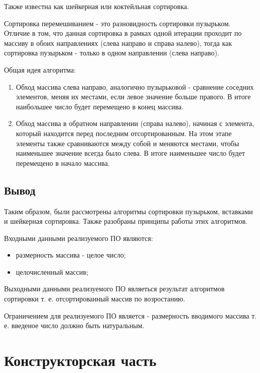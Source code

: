 \documentclass[12pt,a4paper]{report}
\begin{document}
Также известна как шейкерная или коктейльная сортировка.

Сортировка перемешиванием - это разновидность сортировки пузырьком.
 Отличие в том, что данная сортировка в рамках одной итерации 
 проходит по массиву в обоих направлениях (слева направо и справа
  налево), тогда как сортировка пузырьком - только в одном 
  направлении (слева направо).

Общая идея алгоритма:

\begin{enumerate}
    \item 
    Обход массива слева направо, аналогично пузырьковой
     - сравнение соседних элементов, меняя их местами, 
     если левое значение больше правого. В итоге наибольшее 
     число будет перемещено в конец массива.
    \item Обход массива в обратном направлении (справа налево), 
    начиная с элемента, который находится перед последним 
    отсортированным. На этом этапе элементы также сравниваются 
    между собой и меняются местами, чтобы наименьшее значение 
    всегда было слева. В итоге наименьшее число будет перемещено 
    в начало массива.
\end{enumerate}

\section*{Вывод}

Таким образом, были рассмотрены алгоритмы сортировки пузырьком, вставками и шейкерная сортировка.
Также разобраны принципы работы этих алгоритмов.

Входными данными реализуемого ПО являются:

\begin{itemize}
	\item размерность массива - целое число;
	\item целочисленный массив;
\end{itemize}

Выходными данными реализуемого ПО являеться результат алгоритмов сортировки т. е. отсортированный массив по возростанию.

Ограничением для реализуемого ПО является - размерность вводимого массива т. е. введеное число должно быть натуральным.
	

\newpage
\chapter{Конструкторская часть}
\end{document}

